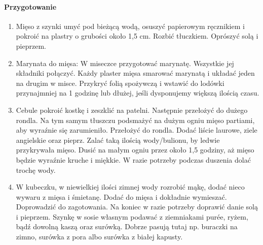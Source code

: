 \documentclass{article}
\begin{document}
    \paragraph{Przygotowanie}
    \begin{enumerate}
        \item Mięso z szynki umyć pod bieżącą wodą, osuszyć papierowym
            ręcznikiem i pokroić na plastry o grubości około 1,5 cm. Rozbić
            tłuczkiem. Oprószyć solą i pieprzem.
        \item Marynata do mięsa: W miseczce przygotować marynatę. Wszystkie jej
            składniki połączyć. Każdy plaster mięsa smarować marynatą i układać
            jeden na drugim w misce. Przykryć folią spożywczą i wstawić do
            lodówki przynajmniej na 1 godzinę lub dłużej, jeśli dysponujemy
            większą ilością czasu.
        \item Cebule pokroić kostkę i zeszklić na patelni. Następnie przełożyć
            do dużego rondla. Na tym samym tłuszczu podsmażyć na dużym ogniu
            mięso partiami, aby wyraźnie się zarumieniło. Przełożyć do rondla.
            Dodać liście laurowe, ziele angielskie oraz pieprz. Zalać taką
            ilością wody/bulionu, by ledwie przykrywała mięso. Dusić na małym
            ogniu przez około 1,5 godziny, aż mięso będzie wyraźnie kruche i
            miękkie. W razie potrzeby podczas duszenia dolać trochę wody.
        \item W kubeczku, w niewielkiej ilości zimnej wody rozrobić mąkę, dodać
            nieco wywaru z mięsa i śmietanę. Dodać do mięsa i dokładnie
            wymieszać.  Doprowadzić do zagotowania. Na koniec w razie potrzeby
            doprawić danie solą i pieprzem. Szynkę w sosie własnym podawać z
            ziemniakami purée, ryżem, bądź dowolną kaszą oraz surówką. Dobrze
            pasują tutaj np. buraczki na zimno, surówka z pora albo surówka z
            białej kapusty.
    \end{enumerate}
    \newpage

%
\end{document}
